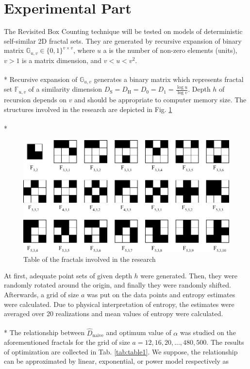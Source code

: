 \section {Experimental Part}



The Revisited Box Counting technique will be tested on models of deterministic self-similar 2D fractal sets. They are generated by recursive expansion of binary matrix $\mathbb{G}_{u,v} \in \{ 0, 1 \}^{v \times v} $, where $u$ a is the number of non-zero elements (units), $v>1$ is a matrix dimension, and $v<u<v^2$. \\
\\*
Recursive expansion of $\mathbb{G}_{u,v}$ generates a binary matrix which represents fractal set $\mathbb{F}_{u,v}$ of a similarity dimension $D_{\text{S}} = D_{\text{H}} = D_{0} = D_{1} = \frac{\log{u}}{\log{v}}$. Depth $h$ of recursion depends on $v$ and should be appropriate to computer memory size. The structures involved in the research are depicted in Fig. \ref{fig:involvedFractals}\\
\\*
\begin{figure}[tbp]
\includegraphics[width=\textwidth]{images/fractals.pdf} 
\caption{Table of the fractals involved in the research}
\label{fig:involvedFractals}
\end{figure}
At first, adequate point sets of given depth $h$ were generated. Then, they were randomly rotated around the origin, and finally they were randomly shifted. Afterwards, a grid of size $a$ was put on the data points and entropy estimates were calculated. Due to physical interpretation of entropy, the estimates were averaged over 20 realizations and mean values of entropy were calculated. \\
\\*
The relationship between $\hat{D}_{\mathrm{naive}}$ and optimum value of $\alpha$ was studied on the aforementioned fractals for the grid of size $a=12,16,20,...,480,500$.  The results of optimization are collected in Tab. \ref{tab:table1}. We suppose, the relationship can be approximated by linear, exponential, or power model respectively as
